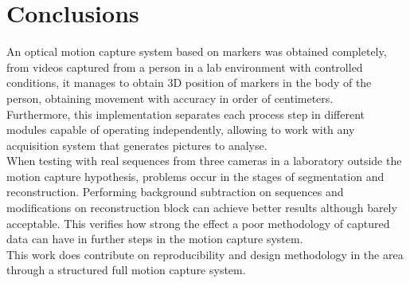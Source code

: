 \section{Conclusions}

An optical motion capture system based on markers was obtained completely,
from videos captured from a person in a lab environment with controlled conditions, it manages to obtain 3D position of markers in the body of the person, obtaining movement with accuracy in order of centimeters.\\
\hspace*{0.5cm} Furthermore, this implementation separates each process step in different modules capable of operating independently, allowing to work with any acquisition system that generates pictures to analyse.\\
\hspace*{0.5cm} When testing with real sequences from three cameras in a laboratory outside the motion capture hypothesis, problems occur in the stages of segmentation and reconstruction. Performing background subtraction on sequences and modifications on reconstruction block can achieve better results although barely acceptable. This verifies how strong the effect a poor methodology of captured data can have in further steps in the motion capture system.\\
\hspace*{0.5cm}This work does contribute on reproducibility and design methodology in the area through a structured full motion capture system.